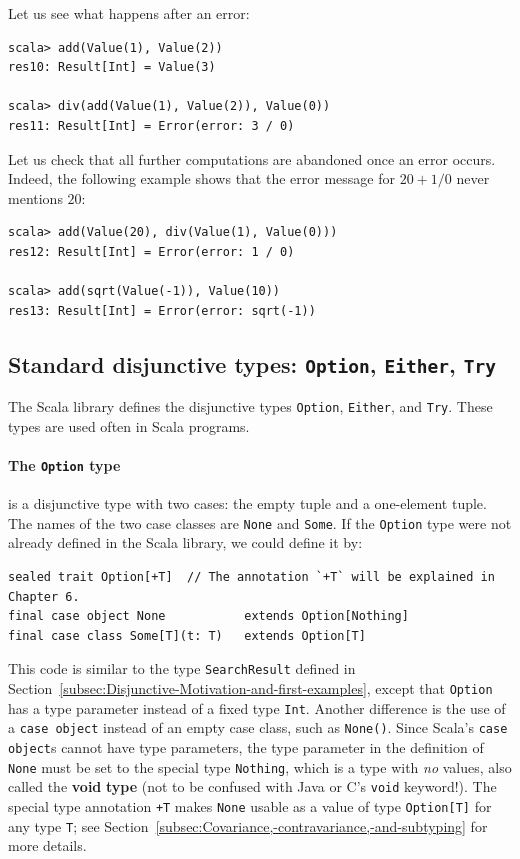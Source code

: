 Let us see what happens after an error:
\begin{lstlisting}
scala> add(Value(1), Value(2))
res10: Result[Int] = Value(3)

scala> div(add(Value(1), Value(2)), Value(0))
res11: Result[Int] = Error(error: 3 / 0)
\end{lstlisting}
Let us check that all further computations are abandoned once an error
occurs. Indeed, the following example shows that the error message
for $20+1/0$ never mentions $20$:
\begin{lstlisting}
scala> add(Value(20), div(Value(1), Value(0)))
res12: Result[Int] = Error(error: 1 / 0)

scala> add(sqrt(Value(-1)), Value(10))
res13: Result[Int] = Error(error: sqrt(-1))
\end{lstlisting}


\subsection{\label{subsec:Standard-disjunctive-types:}Standard disjunctive types:
\texttt{Option}, \texttt{Either}, \texttt{Try}}

The Scala library defines the disjunctive types \lstinline!Option!,
\lstinline!Either!, and \lstinline!Try!. These types are used often
in Scala programs.

\paragraph{The \texttt{Option} type}

is a disjunctive type with two cases: the empty tuple and a one-element
tuple. The names of the two case classes are \lstinline!None! and
\lstinline!Some!. If the \lstinline!Option! type were not already
defined in the Scala library, we could define it by:
\begin{lstlisting}
sealed trait Option[+T]  // The annotation `+T` will be explained in Chapter 6.
final case object None           extends Option[Nothing]
final case class Some[T](t: T)   extends Option[T]
\end{lstlisting}
This code is similar to the type \lstinline!SearchResult! defined
in Section~\ref{subsec:Disjunctive-Motivation-and-first-examples},
except that \lstinline!Option! has a type parameter instead of a
fixed type \lstinline!Int!. Another difference is the use of a \lstinline!case object!
instead of an empty case class, such as \lstinline!None()!. Since
Scala\textsf{'}s \lstinline!case object!s cannot have type parameters, the
type parameter in the definition of \lstinline!None! must be set
to the special type \lstinline!Nothing!, which is a type with \emph{no}
values, also called the \textbf{void} \textbf{type}
(not to be confused with Java or C\textsf{'}s \lstinline!void! keyword!).
The special type annotation \lstinline!+T! makes \lstinline!None!
usable as a value of type \lstinline!Option[T]! for any type \lstinline!T!;
see Section~\ref{subsec:Covariance,-contravariance,-and-subtyping}
for more details.

